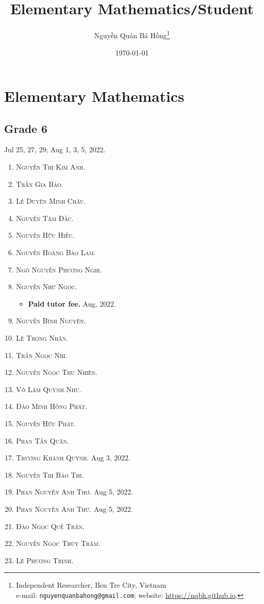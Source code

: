\documentclass{article}
\title{Elementary Mathematics\texttt{/}Student}
\author{\selectlanguage{vietnamese} Nguyễn Quản Bá Hồng\footnote{Independent Researcher, Ben Tre City, Vietnam\\e-mail: \texttt{nguyenquanbahong@gmail.com}; website: \url{https://nqbh.github.io}.}}
\date{\today}
\numberwithin{equation}{section}
\begin{document}
\maketitle
{}
\begin{abstract}
	
\end{abstract}

\tableofcontents
{}


\section{Elementary Mathematics}

\subsection{Grade 6}
Jul 25, 27, 29; Aug 1, 3, 5, 2022.
\begin{enumerate}
	\item \textsc{Nguyễn Thị Kim Anh.}
	\item \textsc{Trần Gia Bảo.}
	\item \textsc{Lê Duyên Minh Châu.}
	\item \textsc{Nguyễn Tâm Đắc.}
	\item \textsc{Nguyễn Hữu Hiếu.}
	\item \textsc{Nguyễn Hoàng Bảo Lam.}
	\item \textsc{Ngô Nguyễn Phương Nghi.}
	\item \textsc{Nguyễn Như Ngọc.}
	\begin{itemize}
		\item \textbf{Paid tutor fee.} Aug, 2022.
	\end{itemize}
	\item \textsc{Nguyễn Bình Nguyên.}
	\item \textsc{Lê Trọng Nhân.}
	\item \textsc{Trần Ngọc Nhi.}
	\item \textsc{Nguyễn Ngọc Thu Nhiên.}
	\item \textsc{Võ Lâm Quỳnh Như.}
	\item \textsc{Đào Minh Hồng Phát.}
	\item \textsc{Nguyễn Hữu Phát.}
	\item \textsc{Phan Tấn Quân.}
	\item \textsc{Trương Khánh Quỳnh.} Aug 3, 2022.
	\item \textsc{Nguyễn Thị Bảo Thi.}
	\item \textsc{Phan Nguyễn Anh Thơ.} Aug 5, 2022.
	\item \textsc{Phan Nguyễn Anh Thư.} Aug 5, 2022.
	\item \textsc{Đào Ngọc Quế Trân.}
	\item \textsc{Nguyễn Ngọc Thùy Trâm.}
	\item \textsc{Lê Phương Trinh.}
\end{enumerate}
\end{document}
